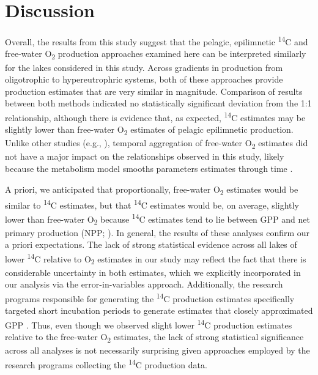 \documentclass[12pt, oneside]{article}
\begin{document}
\section*{Discussion}

Overall, the results from this study suggest that the pelagic, epilimnetic \textsuperscript{14}C and free-water O\textsubscript{2} production approaches examined here can be interpreted similarly for the lakes considered in this study. Across gradients in production from oligotrophic to hypereutrophric systems, both of these approaches provide production estimates that are very similar in magnitude. Comparison of results between both methods indicated no statistically significant deviation from the 1:1 relationship, although there is evidence that, as expected, \textsuperscript{14}C estimates may be slightly lower than free-water O\textsubscript{2} estimates of pelagic epilimnetic production. Unlike other studies (e.g., \citealt{staehr_lake_2010}), temporal aggregation of free-water O\textsubscript{2} estimates did not have a major impact on the relationships observed in this study, likely because the metabolism model smooths parameters estimates through time \citep{phillips_timevarying_2020}.

A priori, we anticipated that proportionally, free-water O\textsubscript{2} estimates would be similar to \textsuperscript{14}C estimates, but that \textsuperscript{14}C estimates would be, on average, slightly lower than free-water O\textsubscript{2} because \textsuperscript{14}C estimates tend to lie between GPP and net primary production (NPP; \citealt{peterson_aquatic_1980}). In general, the results of these analyses confirm our a priori expectations. The lack of strong statistical evidence across all lakes of lower \textsuperscript{14}C relative to O\textsubscript{2} estimates in our study may reflect the fact that there is considerable uncertainty in both estimates, which we explicitly incorporated in our analysis via the error-in-variables approach. Additionally, the research programs responsible for generating the \textsuperscript{14}C production estimates specifically targeted short incubation periods to generate estimates that closely approximated GPP \citep{hall_measuring_2007}. Thus, even though we observed slight lower \textsuperscript{14}C production estimates relative to the free-water O\textsubscript{2} estimates, the lack of strong statistical significance across all analyses is not necessarily surprising given approaches employed by the research programs collecting the \textsuperscript{14}C production data.
\end{document}
